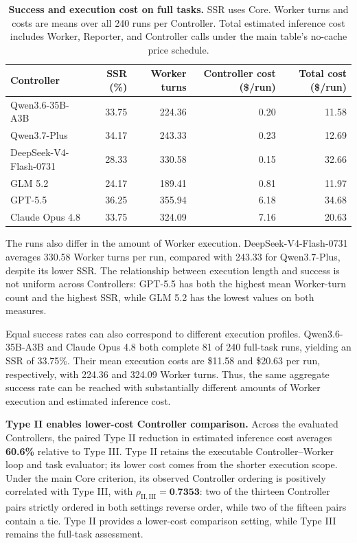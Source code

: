 \begin{table}[t]
\caption{\textbf{Success and execution cost on full tasks.} SSR uses Core. Worker turns and costs are means over all 240 runs per Controller. Total estimated inference cost includes Worker, Reporter, and Controller calls under the main table's no-cache price schedule.}
\label{tab:controller-execution}
\centering
\small
\setlength{\tabcolsep}{4pt}
\begin{tabular*}{\linewidth}{@{\extracolsep{\fill}}lrrrr@{}}
\toprule
Controller & SSR (\%) & Worker turns & \shortstack{Controller cost\\(\$/run)} & \shortstack{Total cost\\(\$/run)} \\
\midrule
Qwen3.6-35B-A3B & 33.75 & 224.36 & 0.20 & 11.58 \\
Qwen3.7-Plus & 34.17 & 243.33 & 0.23 & 12.69 \\
DeepSeek-V4-Flash-0731 & 28.33 & 330.58 & 0.15 & 32.66 \\
GLM 5.2 & 24.17 & 189.41 & 0.81 & 11.97 \\
GPT-5.5 & 36.25 & 355.94 & 6.18 & 34.68 \\
Claude Opus 4.8 & 33.75 & 324.09 & 7.16 & 20.63 \\
\bottomrule
\end{tabular*}
\end{table}

The runs also differ in the amount of Worker execution. DeepSeek-V4-Flash-0731 averages 330.58 Worker turns per run, compared with 243.33 for Qwen3.7-Plus, despite its lower SSR. The relationship between execution length and success is not uniform across Controllers: GPT-5.5 has both the highest mean Worker-turn count and the highest SSR, while GLM 5.2 has the lowest values on both measures.

Equal success rates can also correspond to different execution profiles. Qwen3.6-35B-A3B and Claude Opus 4.8 both complete 81 of 240 full-task runs, yielding an SSR of 33.75\%. Their mean execution costs are \$11.58 and \$20.63 per run, respectively, with 224.36 and 324.09 Worker turns. Thus, the same aggregate success rate can be reached with substantially different amounts of Worker execution and estimated inference cost.

\noindent\textbf{Type II enables lower-cost Controller comparison.}
Across the evaluated Controllers, the paired Type II reduction in estimated inference cost averages \textbf{60.6\%} relative to Type III. Type II retains the executable Controller--Worker loop and task evaluator; its lower cost comes from the shorter execution scope. Under the main Core criterion, its observed Controller ordering is positively correlated with Type III, with \(\rho_{\mathrm{II},\mathrm{III}}=\textbf{0.7353}\): two of the thirteen Controller pairs strictly ordered in both settings reverse order, while two of the fifteen pairs contain a tie. Type II provides a lower-cost comparison setting, while Type III remains the full-task assessment.

